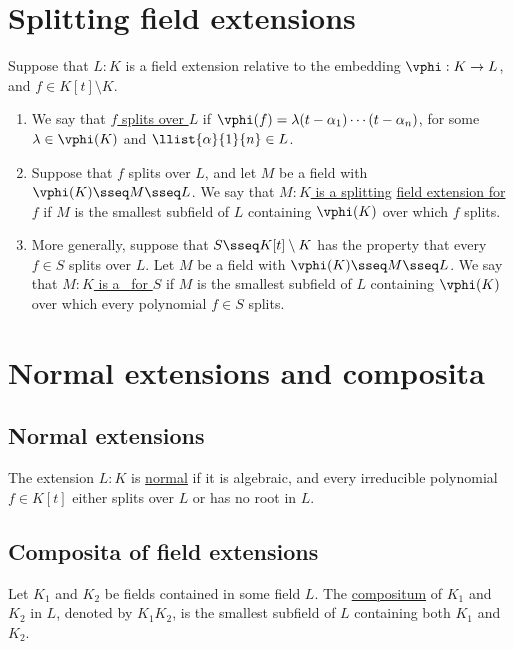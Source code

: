\documentclass{article}
\begin{document}
\section{Splitting field extensions}
  \begin{tdefinition}
    Suppose that \( L:K \) is a field extension relative to the embedding \( \vphi : K\to L \), and \( f\in K[t]\setminus K \). \begin{enumerate}[label=(\roman*)]
      \item We say that \ul{\( f \) splits over \( L \)} if \( \vphi(f)=\lambda(t-\alpha_1)\cdots(t-\alpha_n) \), for some \( \lambda\in \vphi(K) \) and \( \llist{\alpha}{1}{n}\in L \).
      \item Suppose that \( f \) splits over \( L \), and let \( M \) be a field with \( \vphi(K)\sseq M\sseq L \). We say that \ul{\( M:K \) is a splitting} \ul{field extension for \( f \)} if \( M \) is the smallest subfield of \( L \) containing \( \vphi(K) \) over which \( f \) splits.
      \item More generally, suppose that \( S\sseq K[t]\setminus K \) has the property that every \( f\in S \) splits over \( L \). Let \( M \) be a field with \( \vphi(K)\sseq M\sseq L \). We say that \ul{\( M:K \) is a \sfe~for \( S \)} if \( M \) is the smallest subfield of \( L \) containing \( \vphi(K) \) over which every polynomial \( f\in S \) splits.
    \end{enumerate}
  \end{tdefinition}

\section{Normal extensions and composita}
\subsection{Normal extensions}
  \begin{tdefinition}
    The extension \( L:K \) is \ul{normal} if it is algebraic, and every irreducible polynomial \( f\in K[t] \) either splits over \( L \) or has no root in \( L \).
  \end{tdefinition}

\subsection{Composita of field extensions}
  \begin{tdefinition}[Compositum]
    Let \( K_1 \) and \( K_2 \) be fields contained in some field \( L \).
    The \ul{compositum} of \( K_1 \) and \( K_2 \) in \( L \), denoted by \( K_1K_2 \), is the smallest subfield of \( L \) containing both \( K_1 \) and \( K_2 \).
  \end{tdefinition}
\end{document}

